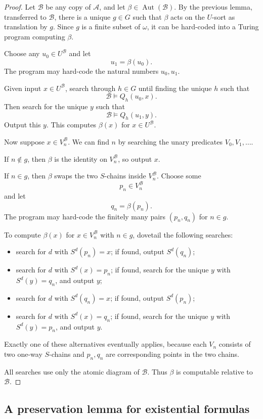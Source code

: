 \documentclass[12pt]{article}
\newcommand{\Aut}{\operatorname{Aut}}
\begin{document}
\begin{proof}
Let $\mathcal B$ be any copy of $\mathcal A$, and let
$\beta\in\Aut(\mathcal B)$.  By the previous lemma, transferred to
$\mathcal B$, there is a unique $g\in G$ such that $\beta$ acts on the $U$-sort as translation by $g$.  Since $g$ is a finite subset of $\omega$, it can be hard-coded into a Turing program computing $\beta$.

Choose any $u_0\in U^{\mathcal B}$ and let
\[
u_1=\beta(u_0).
\]
The program may hard-code the natural numbers $u_0,u_1$.

Given input $x\in U^{\mathcal B}$, search through $h\in G$ until finding the unique $h$ such that
\[
\mathcal B\models Q_h(u_0,x).
\]
Then search for the unique $y$ such that
\[
\mathcal B\models Q_h(u_1,y).
\]
Output this $y$.  This computes $\beta(x)$ for $x\in U^{\mathcal B}$.

Now suppose $x\in V_n^{\mathcal B}$.  We can find $n$ by searching the unary predicates $V_0,V_1,\dots$.

If $n\notin g$, then $\beta$ is the identity on $V_n^{\mathcal B}$, so output $x$.

If $n\in g$, then $\beta$ swaps the two $S$-chains inside $V_n^{\mathcal B}$.  Choose some
\[
p_n\in V_n^{\mathcal B}
\]
and let
\[
q_n=\beta(p_n).
\]
The program may hard-code the finitely many pairs $(p_n,q_n)$ for $n\in g$.

To compute $\beta(x)$ for $x\in V_n^{\mathcal B}$ with $n\in g$, dovetail the following searches:
\begin{itemize}
\item search for $d$ with $S^d(p_n)=x$; if found, output $S^d(q_n)$;
\item search for $d$ with $S^d(x)=p_n$; if found, search for the unique $y$ with $S^d(y)=q_n$, and output $y$;
\item search for $d$ with $S^d(q_n)=x$; if found, output $S^d(p_n)$;
\item search for $d$ with $S^d(x)=q_n$; if found, search for the unique $y$ with $S^d(y)=p_n$, and output $y$.
\end{itemize}
Exactly one of these alternatives eventually applies, because each $V_n$ consists of two one-way $S$-chains and $p_n,q_n$ are corresponding points in the two chains.

All searches use only the atomic diagram of $\mathcal B$.  Thus $\beta$ is computable relative to $\mathcal B$.
\end{proof}

\subsection*{A preservation lemma for existential formulas}
\end{document}
